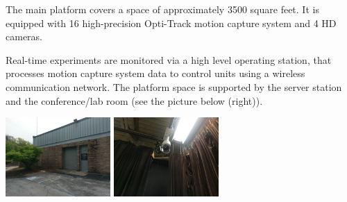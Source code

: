  The main platform covers a space of approximately 3500 square feet. It is equipped with 16 high-precision Opti-Track motion capture system and 4 HD cameras. 
 
Real-time experiments are monitored via a high level operating station, that processes motion capture system data to control units using a wireless communication network. The platform space is supported by the server station and the conference/lab room (see the picture below (right)).

 \begin{center}
\includegraphics[height=3cm]{Facilities/IMAG1065}
\includegraphics[height=3cm]{Facilities/IMAG1089}

\end{center}





